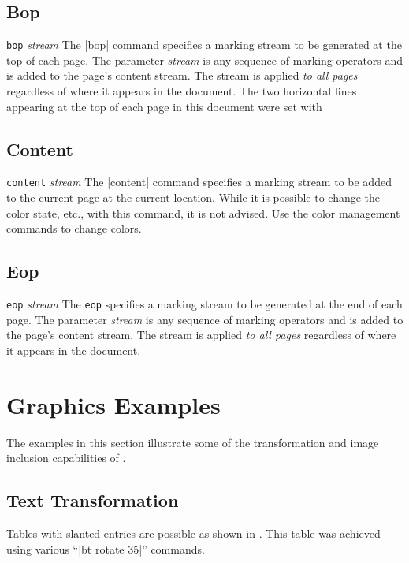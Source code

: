 {\subsection{Bop}
\syntax
{\tt bop} {\it stream}
\description
The |bop| command specifies a marking
stream to be generated at the top of each page.
The parameter {\it stream} is any sequence
of marking operators and is added to the page's content stream.  
The stream is applied {\it to all pages} regardless
of where it appears in the document.
\example  The two horizontal lines appearing
at the top of each page in this document
were set with
\begintt
{}
\endtt
{}

\subsection{Content}
\syntax
{\tt content} {\it stream}
\description
The |content| command specifies a marking
stream to be added to the current page at
the current location.  While it
is possible to change the color
state, etc., with this command, it is
not advised.  Use the color management
commands to change colors.


\subsection{Eop}
\syntax
\beginlist
{\tt eop} {\it stream}
\endlist
\description
The {\tt eop} specifies a marking stream to be generated at the end
of each page. The parameter {\it stream} is any sequence
of marking operators and is added to the page's content stream.  
The stream is applied {\it to all pages} regardless
of where it appears in the document.

\section{Graphics Examples}

The examples in this section illustrate some of the transformation
and image inclusion capabilities of \dvipdfm.

\subsection{Text Transformation}
Tables with slanted entries are possible as shown
in .  This table was achieved using
various ``|bt rotate 35|'' commands.

}
